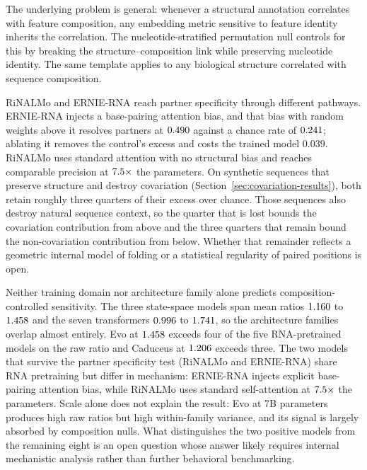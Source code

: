 \documentclass[11pt]{article}
\begin{document}
The underlying problem is general: whenever a structural annotation
correlates with feature composition, any embedding metric sensitive to
feature identity inherits the correlation. The nucleotide-stratified
permutation null controls for this by breaking the structure--composition
link while preserving nucleotide identity. The same template applies to
any biological structure correlated with sequence composition.

RiNALMo and ERNIE-RNA reach partner specificity through different pathways.
ERNIE-RNA injects a base-pairing attention bias, and that bias with random
weights above it resolves partners at $0.490{}$
against a chance rate of $0.241{}$;
ablating it removes the control's excess and costs the trained model $0.039$.
RiNALMo uses standard attention with no structural bias and reaches comparable
precision at $7.5{}\times$ the parameters. On synthetic sequences that preserve
structure and destroy covariation (Section~\ref{sec:covariation-results}), both
retain roughly three quarters of their excess over chance. Those sequences also
destroy natural sequence context, so the quarter that is lost bounds the
covariation contribution from above and the three quarters that remain bound
the non-covariation contribution from below. Whether that remainder reflects a
geometric internal model of folding or a statistical regularity of paired
positions is open.

Neither training domain nor architecture family alone predicts
composition-controlled sensitivity. The three state-space models span mean
ratios $1.160{}$ to $1.458{}$ and the seven transformers
$0.996{}$ to $1.741{}$, so the architecture families overlap
almost entirely. Evo at $1.458{}$ exceeds four of the five RNA-pretrained
models on the raw ratio and Caduceus at $1.206{}$ exceeds three. The two models
that survive the partner specificity test (RiNALMo and ERNIE-RNA) share
RNA pretraining but differ in mechanism: ERNIE-RNA injects explicit
base-pairing attention bias, while RiNALMo uses standard self-attention at
$7.5{}\times$ the parameters. Scale alone does not explain the result:
Evo at 7B parameters produces high raw ratios but high within-family
variance, and its signal is largely absorbed by composition nulls. What
distinguishes the two positive models from the remaining eight is an open
question whose answer likely requires internal mechanistic analysis rather
than further behavioral benchmarking.
\end{document}

